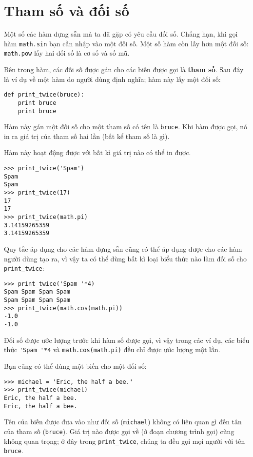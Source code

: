 \documentclass[11pt]{book}
\begin{document}
\section{Tham số và đối số}
\label{tham số}

Một số các hàm dựng sẵn mà ta đã gặp có yêu cầu đối số. Chẳng hạn,
khi gọi hàm {\tt math.sin} bạn cần nhập vào một đối số. Một số
hàm còn lấy hơn một đối số: {\tt math.pow} lấy hai đối số là
cơ số và số mũ.

Bên trong hàm, các đối số được gán cho các biến được gọi là
{\bf tham số}. Sau đây là ví dụ về một hàm do người dùng định nghĩa;
hàm này lấy một đối số:


\beforeverb
\begin{verbatim}
def print_twice(bruce):
    print bruce
    print bruce
\end{verbatim}
\afterverb
%
Hàm này gán một đối số cho một tham số có tên là
{\tt bruce}. Khi hàm được gọi, nó in ra giá trị
của tham số hai lần (bất kể tham số là gì).

Hàm này hoạt động được với bất kì giá trị nào có thể
in được.

\beforeverb
\begin{verbatim}
>>> print_twice('Spam')
Spam
Spam
>>> print_twice(17)
17
17
>>> print_twice(math.pi)
3.14159265359
3.14159265359
\end{verbatim}
\afterverb
%
Quy tắc áp dụng cho các hàm dựng sẵn cũng có thể áp dụng được cho các
hàm người dùng tạo ra, vì vậy ta có thể dùng bất kì loại biểu thức nào
làm đối số cho \verb"print_twice":


\beforeverb
\begin{verbatim}
>>> print_twice('Spam '*4)
Spam Spam Spam Spam
Spam Spam Spam Spam
>>> print_twice(math.cos(math.pi))
-1.0
-1.0
\end{verbatim}
\afterverb
%
Đối số được ước lượng trước khi hàm số được gọi, vì vậy trong
các ví dụ, các biểu thức \verb"'Spam '*4" và
{\tt math.cos(math.pi)} đều chỉ được ước lượng một lần.


Bạn cũng có thể dùng một biến cho một đối số:

\beforeverb
\begin{verbatim}
>>> michael = 'Eric, the half a bee.'
>>> print_twice(michael)
Eric, the half a bee.
Eric, the half a bee.
\end{verbatim}
\afterverb
%
Tên của biến được đưa vào như đối số ({\tt michael}) không có
liên quan gì đến tân của tham số ({\tt bruce}). Giá trị nào được
gọi về (ở đoạn chương trình gọi) cũng không quan trọng; ở đây
trong \verb"print_twice", chúng ta đều gọi mọi người với tên {\tt bruce}.
\end{document}
